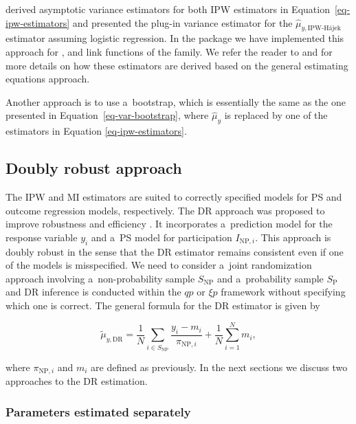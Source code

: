 \documentclass[
]{jss}
\begin{document}
\citet[Section 3.2]{chen2020doubly} derived asymptotic variance
estimators for both IPW estimators in Equation~\ref{eq-ipw-estimators}
and presented the plug-in variance estimator for the
\(\hat{\mu}_{y,\text{IPW-H\'{a}jek}}\) estimator assuming logistic
regression. In the package we have implemented this approach for
,  and  link functions of
the  family. We refer the reader to
\citet[Section 6.2]{wu2022statistical} and
\citet[Chapter 3]{chrostowski2024statistical} for more details on how
these estimators are derived based on the general estimating equations
approach.

Another approach is to use a~bootstrap, which is essentially the same as
the one presented in Equation~\ref{eq-var-bootstrap}, where
\(\hat{\mu}_{y}\) is replaced by one of the estimators in Equation
\ref{eq-ipw-estimators}.

\subsection{Doubly robust approach}\label{sec-dr-approach}

The IPW and MI estimators are suited to correctly specified models for
PS and outcome regression models, respectively. The DR approach was
proposed to improve robustness and efficiency
\citep[cf.][]{robins1994estimation}. It incorporates a~prediction model
for the response variable \(y_i\) and a~PS model for participation
\(I_{\text{NP},i}\). This approach is doubly robust in the sense that
the DR estimator remains consistent even if one of the models is
misspecified. We need to consider a~joint randomization approach
involving a~non-probability sample \(S_{\text{NP}}\) and a~probability
sample \(S_{\text{P}}\) and DR inference is conducted within the \(qp\)
or \(\xi p\) framework without specifying which one is correct. The
general formula for the DR estimator is given by

\[
\tilde{\mu}_{y,\text{DR}} = \frac{1}{N}\sum_{i \in S_{\text{NP}}}\frac{y_i - m_i}{\pi_{\text{NP},i}} + \frac{1}{N}\sum_{i =1}^N m_i,
\]

where \(\pi_{\text{NP},i}\) and \(m_i\) are defined as previously. In
the next sections we discuss two approaches to the DR estimation.

\subsubsection{Parameters estimated
separately}\label{parameters-estimated-separately}
\end{document}

